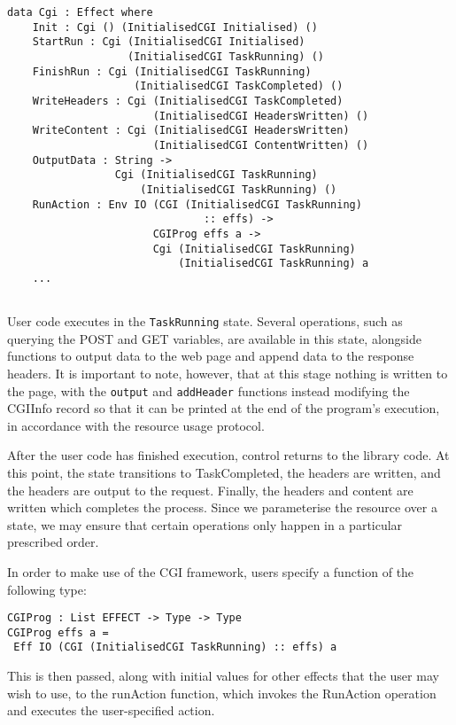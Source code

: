 \documentclass[preprint]{sigplanconf}
\begin{document}
{\small
\begin{verbatim}
data Cgi : Effect where
    Init : Cgi () (InitialisedCGI Initialised) ()
    StartRun : Cgi (InitialisedCGI Initialised) 
                   (InitialisedCGI TaskRunning) ()
    FinishRun : Cgi (InitialisedCGI TaskRunning) 
                    (InitialisedCGI TaskCompleted) ()
    WriteHeaders : Cgi (InitialisedCGI TaskCompleted) 
                       (InitialisedCGI HeadersWritten) ()
    WriteContent : Cgi (InitialisedCGI HeadersWritten) 
                       (InitialisedCGI ContentWritten) ()
    OutputData : String -> 
                 Cgi (InitialisedCGI TaskRunning) 
                     (InitialisedCGI TaskRunning) ()
    RunAction : Env IO (CGI (InitialisedCGI TaskRunning) 
                               :: effs) -> 
                       CGIProg effs a -> 
                       Cgi (InitialisedCGI TaskRunning) 
                           (InitialisedCGI TaskRunning) a
    ...
    
\end{verbatim}
}
User code executes in the \texttt{TaskRunning} state. Several operations, such as querying the POST and GET variables, are available in this state, alongside functions to output data to the web page and append data to the response headers. It is important to note, however, that at this stage nothing is written to the page, with the \texttt{output} and \texttt{addHeader} functions instead modifying the CGIInfo record so that it can be printed at the end of the program's execution, in accordance with the resource usage protocol.

After the user code has finished execution, control returns to the library code. At this point, the state transitions to TaskCompleted, the headers are written, and the headers are output to the request. Finally, the headers and content are written which completes the process. Since we parameterise the resource over a state, we may ensure that certain operations only happen in a particular prescribed order.

In order to make use of the CGI framework, users specify a function of the following type:
{\small
\begin{verbatim}
CGIProg : List EFFECT -> Type -> Type
CGIProg effs a = 
 Eff IO (CGI (InitialisedCGI TaskRunning) :: effs) a
\end{verbatim}
}
This is then passed, along with initial values for other effects that the user may wish to use, to the runAction function, which invokes the RunAction operation and executes the user-specified action.
\end{document}
